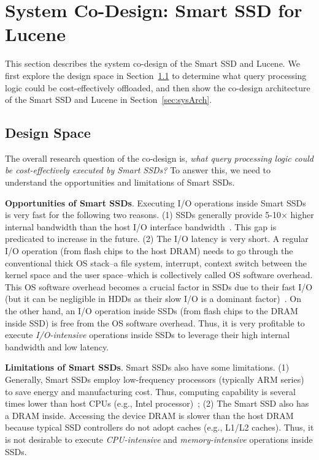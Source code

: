 
\section{System Co-Design: Smart SSD for Lucene}\label{sec:design}
This section describes the system co-design of the Smart SSD and Lucene.
We first explore the design space in Section~\ref{sec:designSpace} to determine what query processing logic could be cost-effectively offloaded, and then show the co-design architecture of the Smart SSD and Lucene in Section~\ref{sec:sysArch}.

\subsection{Design Space}\label{sec:designSpace}

The overall research question of the co-design is, \emph{what query processing logic could be cost-effectively executed by Smart SSDs?} To answer this, we need to understand the opportunities and limitations of Smart SSDs. %

\textbf{Opportunities of Smart SSDs}. Executing I/O operations inside Smart SSDs is very fast for the following two reasons. (1) SSDs generally provide 5-10$\times$ higher internal bandwidth than the host I/O interface bandwidth~\cite{Do2013QPS,De2013}. This gap is predicated to increase in the future. (2) The I/O latency is very short. A regular I/O operation (from flash chips to the host DRAM) needs to go through the conventional thick OS stack--a file system, interrupt, context switch between the kernel space and the user space--which is collectively called OS software overhead. This OS software overhead becomes a crucial factor in SSDs due to their fast I/O (but it can be negligible in HDDs as their slow I/O is a dominant factor)~\cite{Caulfield2010}. On the other hand, an I/O operation inside SSDs (from flash chips to the DRAM inside SSD) is free from the OS software overhead. Thus, it is very profitable to execute \emph{I/O-intensive} operations inside SSDs to leverage their high internal bandwidth and low latency. %

\textbf{Limitations of Smart SSDs}. Smart SSDs also have some limitations. (1) Generally, Smart SSDs employ low-frequency processors (typically ARM series) to save energy and manufacturing cost. Thus, computing capability is several times lower than host CPUs (e.g., Intel processor)~\cite{Do2013QPS,De2013}; (2) The Smart SSD also has a DRAM inside. Accessing the device DRAM is slower than the host DRAM because typical SSD controllers do not adopt caches (e.g., L1/L2 caches). Thus, it is not desirable to execute \emph{CPU-intensive} and \emph{memory-intensive} operations inside SSDs. %

